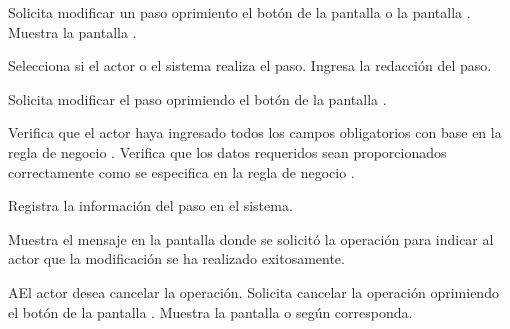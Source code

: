  \begin{UCtrayectoria}
	\UCpaso[\UCactor] Solicita modificar un paso oprimiento el botón \btnEditar de la pantalla  o la pantalla . 
	\UCpaso[\UCsist] Muestra la pantalla . 
	
	\UCpaso[\UCactor] Selecciona si el actor o el sistema realiza el paso.\label{cu5.1.1.1.2:ingresaDatos}
	\UCpaso[\UCactor] Ingresa la redacción del paso.
	
	\UCpaso[\UCactor] Solicita modificar el paso oprimiendo el botón  de la pantalla .  
	
	\UCpaso[\UCsist] Verifica que el actor haya ingresado todos los campos obligatorios con base en la regla de negocio . 
	\UCpaso[\UCsist] Verifica que los datos requeridos sean proporcionados correctamente como se especifica en la regla de negocio .  
	
	\UCpaso[\UCsist] Registra la información del paso en el sistema.
	
	\UCpaso[\UCsist] Muestra el mensaje  en la pantalla donde se solicitó la operación
	para indicar al actor que la modificación se ha realizado exitosamente.
    
\end{UCtrayectoria}

    
 \begin{UCtrayectoriaA}{A}{El actor desea cancelar la operación.}
    \UCpaso[\UCactor] Solicita cancelar la operación oprimiendo el botón  de la pantalla .
    \UCpaso[\UCsist] Muestra la pantalla  o  según corresponda.
 \end{UCtrayectoriaA}
 
